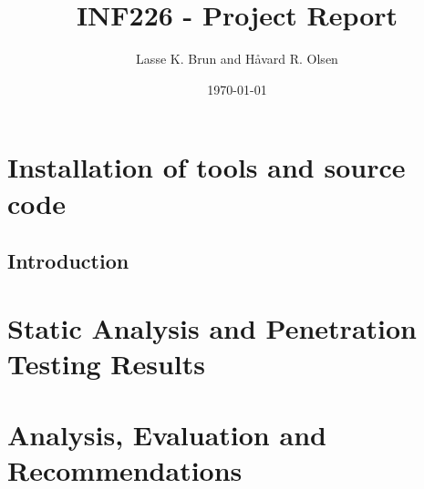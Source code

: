 \documentclass[11pt,english,a4paper]{report}
\title{INF226 - Project Report}
\date{\today}
\author{Lasse K. Brun and Håvard R. Olsen}
\begin{document}
\maketitle

\chapter{Installation of tools and source code}
\section{Introduction}
\paragraph{}

\chapter{Static Analysis and Penetration Testing Results}

\chapter{Analysis, Evaluation and Recommendations}
\end{document}
